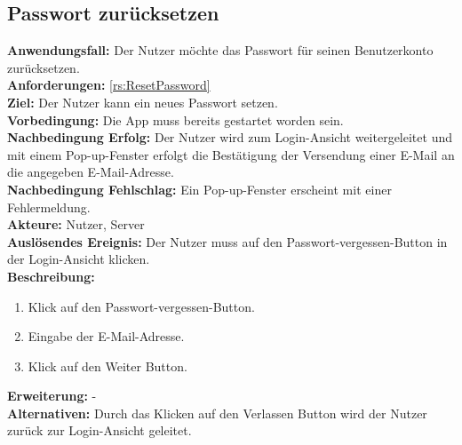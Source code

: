 \documentclass[parskip=full]{scrartcl}
\begin{document}
\subsection{Passwort zurücksetzen}
\textbf{Anwendungsfall:} Der Nutzer möchte das Passwort für seinen Benutzerkonto zurücksetzen.\\
\textbf{Anforderungen:} \ref{rs:ResetPassword}\\
\textbf{Ziel:} Der Nutzer kann ein neues Passwort setzen.\\
\textbf{Vorbedingung:} Die App muss bereits gestartet worden sein.\\
\textbf{Nachbedingung Erfolg:} Der Nutzer wird zum Login-Ansicht weitergeleitet und mit einem Pop-up-Fenster erfolgt die Bestätigung der Versendung einer E-Mail an die angegeben E-Mail-Adresse.\\
\textbf{Nachbedingung Fehlschlag:} Ein Pop-up-Fenster erscheint mit einer Fehlermeldung.\\
\textbf{Akteure:} Nutzer, Server\\
\textbf{Auslösendes Ereignis:} Der Nutzer muss auf den Passwort-vergessen-Button in der Login-Ansicht klicken.\\
\textbf{Beschreibung:}
\begin{enumerate}
    \item Klick auf den Passwort-vergessen-Button.
    \item Eingabe der E-Mail-Adresse.
    \item Klick auf den Weiter Button.
\end{enumerate}
\textbf{Erweiterung:} -\\
\textbf{Alternativen:} Durch das Klicken auf den Verlassen Button wird der Nutzer zurück zur Login-Ansicht geleitet.
\newpage
\end{document}
